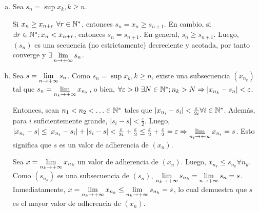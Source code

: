 
{
	\hfill

	\begin{enumerate}[a)]
		
		\item 

			Sea $ s_n = \sup{x_k,k\geq n} $.

			Si $x_n \geq x_{n+r}\ \forall r\in\mathbb{N}^*$, entonces $s_n = x_n \geq s_{n+1}$.
			En cambio, si $\exists r\in\mathbb{N}^*; x_n < x_{n+r}$, entonces $s_n=s_{n+1}$.
			En general, $s_n\geq s_{n+1}$.
			Luego, $(s_n)$ es una secuencia (no estrictamente) decreciente y acotada, por tanto converge y $\exists \limite{n}{s_n}$.

		\item

			Sea $s = \limite{n}{s_n}$.
			Como $s_n = \sup{x_k,k\geq n}$, existe una subsecuencia $(x_{n_k})$ tal que $s_n = \limite{n_k}{x_{n_k}}$, o bien, $\forall\varepsilon>0\ \exists N\in\mathbb{N}^*; n_k>N\Rightarrow |x_{n_k}-s_n|<\varepsilon$.

			Entonces, sean $n_1<n_2<\ldots\in\mathbb{N}^*$ tales que $|x_{n_i}-s_i|<\frac{\varepsilon}{2i}\forall i\in\mathbb{N}^*$.
			Además, para $i$ suficientemente grande, $|s_i-s|<\frac{\varepsilon}{2}$.
			Luego, $|x_{n_i}-s| \leq |x_{n_i}-s_i| + |s_i-s| < \frac{\varepsilon}{2i} + \frac{\varepsilon}{2} \leq \frac{\varepsilon}{2} + \frac{\varepsilon}{2} = \varepsilon \Rightarrow \limite{n_i}{x_{n_i}} = s$.
			Esto significa que $s$ es un valor de adherencia de $(x_n)$.

			Sea $x = \limite{n_k}{x_{n_k}}$ un valor de adherencia de $(x_n)$.
			Luego, $x_{n_k} \leq s_{n_k} \forall {n_k}$.
			Como $(s_{n_k})$ es una subsecuencia de $(s_n)$, $\limite{n_k}{s_{n_k}} = \limite{n}{s_{n}} = s$.
			Inmediatamente, $x = \limite{n_k}{x_{n_k}} \leq \limite{n_k}{s_{n_k}} = s$, lo cual demuestra que $s$ es el mayor valor de adherencia de $(x_n)$.

	\end{enumerate}
}